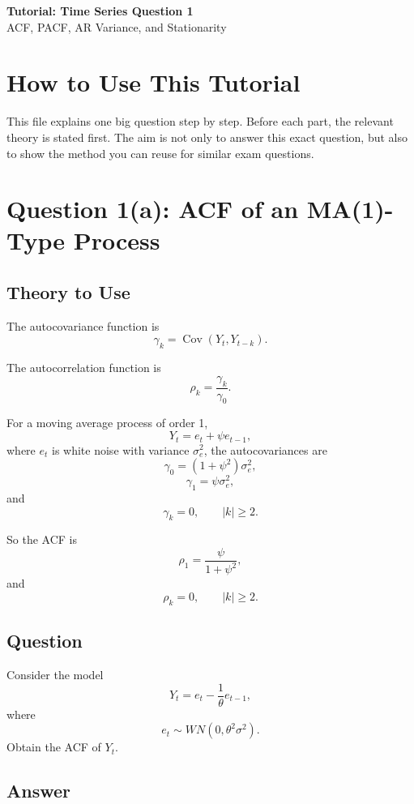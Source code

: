\documentclass[12pt]{article}
\begin{document}
\begin{center}
    {\Large \textbf{Tutorial: Time Series Question 1}}\\
    \vspace{0.2cm}
    {\large ACF, PACF, AR Variance, and Stationarity}
\end{center}

\section*{How to Use This Tutorial}

This file explains one big question step by step.  Before each part, the relevant
theory is stated first.  The aim is not only to answer this exact question, but
also to show the method you can reuse for similar exam questions.

\section*{Question 1(a): ACF of an MA(1)-Type Process}

\subsection*{Theory to Use}

The autocovariance function is
\[
\gamma_k = \operatorname{Cov}(Y_t,Y_{t-k}).
\]

The autocorrelation function is
\[
\rho_k = \frac{\gamma_k}{\gamma_0}.
\]

For a moving average process of order 1,
\[
Y_t = e_t + \psi e_{t-1},
\]
where \(e_t\) is white noise with variance \(\sigma_e^2\), the autocovariances are
\[
\gamma_0 = (1+\psi^2)\sigma_e^2,
\]
\[
\gamma_1 = \psi \sigma_e^2,
\]
and
\[
\gamma_k=0,\qquad |k|\geq 2.
\]

So the ACF is
\[
\rho_1 = \frac{\psi}{1+\psi^2},
\]
and
\[
\rho_k=0,\qquad |k|\geq 2.
\]

\subsection*{Question}

Consider the model
\[
Y_t = e_t - \frac{1}{\theta}e_{t-1},
\]
where
\[
e_t \sim WN(0,\theta^2\sigma^2).
\]
Obtain the ACF of \(Y_t\).

\subsection*{Answer}
\end{document}
